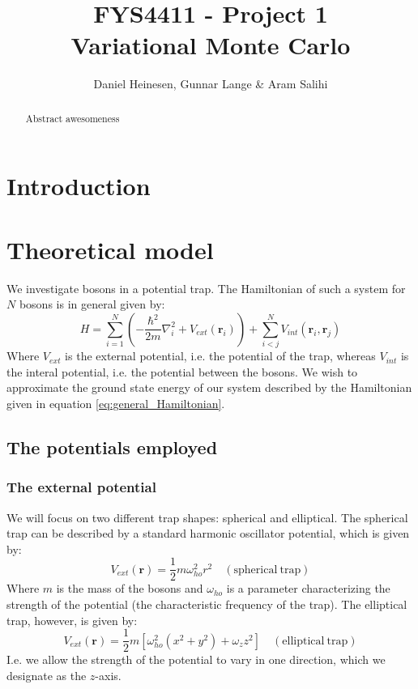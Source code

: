 \documentclass[a4paper, 10pt]{article}
\title{FYS4411 - Project 1\\
	Variational Monte Carlo}
\author{Daniel Heinesen, Gunnar Lange \& Aram Salihi}
\begin{document}
	\maketitle
	\begin{abstract}
		Abstract awesomeness
	\end{abstract}
	\tableofcontents
	\section{Introduction}
	
	
	\section{Theoretical model}
	We investigate bosons in a potential trap. The Hamiltonian of such a system for $N$ bosons is in general given by:
	\begin{equation} \label{eq:general_Hamiltonian}
	H=\sum_{i=1}^N\left(-\frac{\hbar^2}{2m}\nabla_i^2 +V_{ext}(\boldsymbol{r}_i)\right)+\sum_{i<j}^N V_{int}(\boldsymbol{r}_i, \boldsymbol{r}_j)
	\end{equation}
	Where $V_{ext}$ is the external potential, i.e. the potential of the trap, whereas $V_{int}$ is the interal potential, i.e. the potential between the bosons. We wish to approximate the ground state energy of our system described by the Hamiltonian given in equation \ref{eq:general_Hamiltonian}.
	\subsection{The potentials employed}
	\subsubsection{The external potential}
	We will focus on two different trap shapes: spherical and elliptical. The spherical trap can be described by a standard harmonic oscillator potential, which is given by:
	\begin{equation}
	V_{ext}(\boldsymbol{r})=\frac{1}{2}m\omega_{ho}^2 r^2 \quad \mathrm{(spherical\  trap)}
	\end{equation}
	Where $m$ is the mass of the bosons and $\omega_{ho}$ is a parameter characterizing the strength of the potential (the characteristic frequency of the trap). The elliptical trap, however, is given by:
	\begin{equation}
	V_{ext}(\boldsymbol{r})=\frac{1}{2}m[\omega_{ho}^2 (x^2+y^2)+\omega_z z^2] \quad \mathrm{(elliptical\  trap)}
	\end{equation}
	I.e. we allow the strength of the potential to vary in one direction, which we designate as the $z$-axis.
\end{document}
